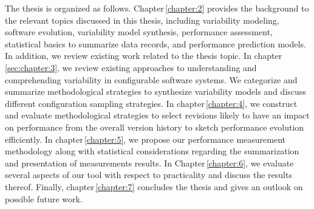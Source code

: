The thesis is organized as follows. Chapter\,\ref{chapter:2} provides the
background to the relevant topics discussed in this thesis, including variability modeling,
software evolution, variability model synthesis, performance assessment,
statistical basics to summarize data records, and performance prediction
models. In addition, we review existing work related to the thesis topic.
In chapter\,\ref{sec:chapter:3}, we review existing approaches to understanding and
comprehending variability in configurable software systems. We categorize and
summarize methodological strategies to synthesize variability models and
discuss different configuration sampling strategies.
In chapter\,\ref{chapter:4}, we construct and evaluate methodological strategies to
select revisions likely to have an impact on performance from the overall
version history to sketch performance evolution efficiently.
In chapter\,\ref{chapter:5}, we propose our performance measurement methodology along
with statistical considerations regarding the summarization and presentation of
measurements results.
In Chapter\,\ref{chapter:6}, we evaluate several aspects of our tool with respect to
practicality and discuss the results thereof. 
Finally, chapter\,\ref{chapter:7} concludes the thesis and gives an outlook on
possible future work.
